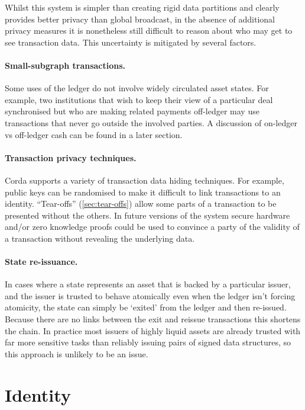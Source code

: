 \documentclass{article}
\begin{document}
Whilst this system is simpler than creating rigid data partitions and clearly provides better privacy than global
broadcast, in the absence of additional privacy measures it is nonetheless still difficult to reason about who may
get to see transaction data. This uncertainty is mitigated by several factors.

\paragraph{Small-subgraph transactions.}Some uses of the ledger do not involve widely circulated asset states. For
example, two institutions that wish to keep their view of a particular deal synchronised but who are making related
payments off-ledger may use transactions that never go outside the involved parties. A discussion of on-ledger vs
off-ledger cash can be found in a later section.

\paragraph{Transaction privacy techniques.}Corda supports a variety of transaction data hiding techniques. For
example, public keys can be randomised to make it difficult to link transactions to an identity. ``Tear-offs''
(\cref{sec:tear-offs}) allow some parts of a transaction to be presented without the others. In future versions of
the system secure hardware and/or zero knowledge proofs could be used to convince a party of the validity of a
transaction without revealing the underlying data.

\paragraph{State re-issuance.}In cases where a state represents an asset that is backed by a particular issuer, and
the issuer is trusted to behave atomically even when the ledger isn't forcing atomicity, the state can simply be
`exited' from the ledger and then re-issued. Because there are no links between the exit and reissue transactions
this shortens the chain. In practice most issuers of highly liquid assets are already trusted with far more
sensitive tasks than reliably issuing pairs of signed data structures, so this approach is unlikely to be an issue.

\section{Identity}\label{sec:identity}
\end{document}
